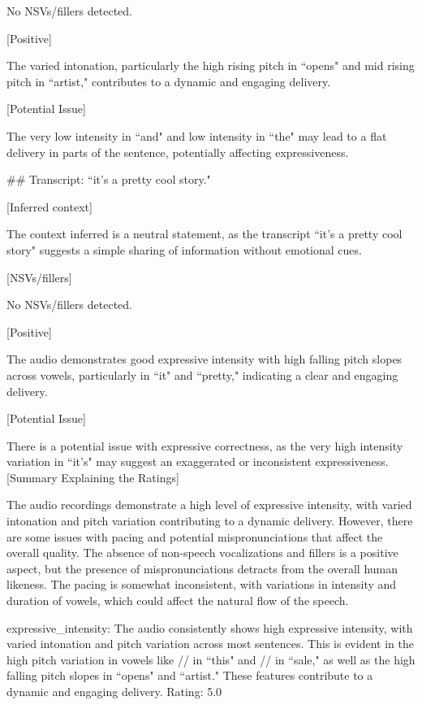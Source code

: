 \begin{tcolorbox}[blue_box, title = {{Audio Sample 3 : Ground-truth Human-likeness Rating = 4.0}}]
No NSVs/fillers detected.


[Positive]  

The varied intonation, particularly the high rising pitch in ``opens" and mid rising pitch in ``artist," contributes to a dynamic and engaging delivery.


[Potential Issue]  

The very low intensity in ``and" and low intensity in ``the" may lead to a flat delivery in parts of the sentence, potentially affecting expressiveness.


\#\# Transcript: ``it's a pretty cool story."

[Inferred context]  

The context inferred is a neutral statement, as the transcript ``it's a pretty cool story" suggests a simple sharing of information without emotional cues.


[NSVs/fillers]  

No NSVs/fillers detected.


[Positive]  

The audio demonstrates good expressive intensity with high falling pitch slopes across vowels, particularly in ``it" and ``pretty," indicating a clear and engaging delivery.


[Potential Issue]  

There is a potential issue with expressive correctness, as the very high intensity variation in ``it's" may suggest an exaggerated or inconsistent expressiveness. \\

[Summary Explaining the Ratings]

The audio recordings demonstrate a high level of expressive intensity, with varied intonation and pitch variation contributing to a dynamic delivery. However, there are some issues with pacing and potential mispronunciations that affect the overall quality. The absence of non-speech vocalizations and fillers is a positive aspect, but the presence of mispronunciations detracts from the overall human likeness. The pacing is somewhat inconsistent, with variations in intensity and duration of vowels, which could affect the natural flow of the speech.


expressive\_intensity: The audio consistently shows high expressive intensity, with varied intonation and pitch variation across most sentences. This is evident in the high pitch variation in vowels like // in ``this" and // in ``sale," as well as the high falling pitch slopes in ``opens" and ``artist." These features contribute to a dynamic and engaging delivery. Rating: 5.0



\end{tcolorbox}
